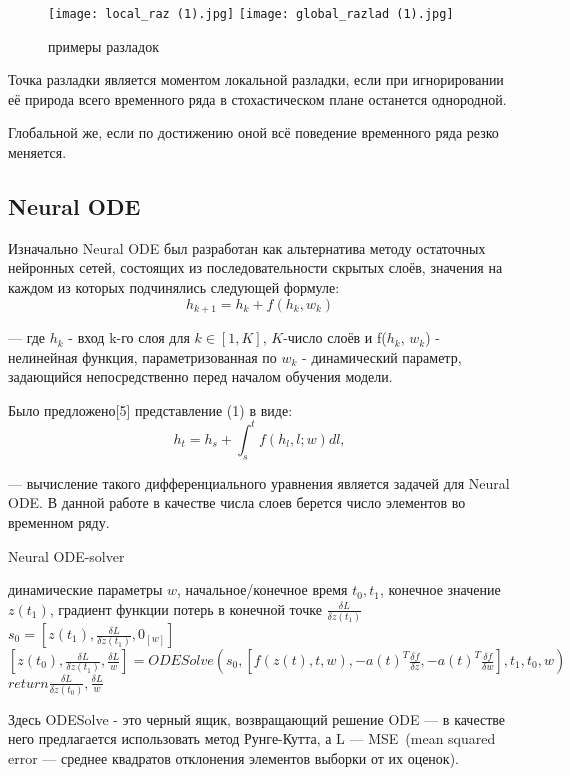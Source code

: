 \documentclass{article}
\begin{document}
    \begin{figure}[htp]
    \centering
    \texttt{[image: local\_raz (1).jpg]}
    \texttt{[image: global\_razlad (1).jpg]}
    \caption{примеры разладок}
    \label{fig:galaxy}
    \end{figure}

    \par Точка разладки является моментом локальной разладки, если при игнорировании её природа всего временного ряда в стохастическом плане останется однородной.
    
    \par Глобальной же, если по достижению оной всё поведение временного ряда резко меняется.  
    
  \subsection{Neural ODE}
    \par Изначально Neural ODE был разработан как альтернатива методу остаточных нейронных сетей, состоящих из последовательности скрытых слоёв, значения на каждом из которых подчинялись следующей формуле:
    \begin{equation} h_{k+1} = h_k + f(h_k, w_k)    \end{equation}
    \par --- где $h_k$ - вход k-го слоя для $k \in [1, K]$, $K$-число слоёв и f($h_k$, $w_k$) - нелинейная функция, параметризованная по $w_k$ - динамический параметр, задающийся непосредственно перед началом обучения модели.
    \par Было предложено[5] представление (1) в виде:
    \begin{equation} h_{t} = h_s + \int_s^t f(h_l, l; w) dl,    \end{equation}
    \par --- вычисление такого дифференциального уравнения является задачей для Neural ODE. В данной работе в качестве числа слоев берется число элементов во временном ряду.

    \begin{algorithm}
     \caption{Neural ODE-solver}\label{alg:cap}
     \begin{algorithmic}
    \Require динамические параметры $w$, начальное/конечное время $t_0,t_1$, конечное значение $z(t_1)$, градиент функции потерь в конечной точке $\frac{\delta L}{\delta z(t_1)}$
    \State $s_0 = [z(t_1), \frac{\delta L}{\delta z(t_1)}, 0_{[w]}]$ 
    \State $[z(t_0), \frac{\delta L}{\delta z(t_1)}, \frac{\delta L}{w}] = ODESolve(s_0, [f(z(t), t, w), -a(t)^T \frac{\delta f}{\delta z}, -a(t)^T \frac{\delta f}{\delta w}], t_1, t_0, w)$
    \State $return \frac{\delta L}{\delta z(t_0)}, \frac{\delta L}{w}$ 
\end{algorithmic}
\end{algorithm}
   \par Здесь ODESolve - это черный ящик, возвращающий решение ODE --- в качестве него предлагается использовать метод Рунге-Кутта, а L --- MSE~(mean squared error --- среднее квадратов отклонения элементов выборки от их оценок).
\end{document}

